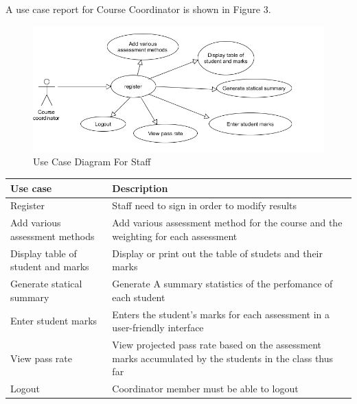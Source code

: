 	A use case report for Course Coordinator is shown in Figure 3.
	\begin{center}
		\begin{figure}[h]
			\centering
			\includegraphics[trim={0cm 0cm 0cm 0cm },clip,scale = 0.85]{CourseCoordinatorUsecase}
			\caption{Use Case Diagram For Staff}
		\end{figure}
	\end{center}
	
	
	
	\begin{center}
		\begin{tabular}{ | p{3cm} | p{10cm}| }
			\hline
			\textbf{Use case}& \textbf{Description} \\ \hline
			Register & Staff need to sign in order to modify results \\ \hline
			Add various assessment methods & Add various assessment method for the course and the weighting for each assessment  \\ \hline
			
			Display table of student and marks & Display or print out the table
of studets and their marks\\ \hline
            Generate statical summary & Generate A summary statistics of the perfomance of each student  \\ \hline
            Enter student marks & Enters the student's marks for each assessment in a user-friendly interface \\ \hline
            View pass rate & View projected pass rate based on the assessment marks accumulated by the students in the class thus far \\ \hline
			Logout          & Coordinator member must be able to logout  \\ \hline
			
		\end{tabular}
	\end{center}
	
